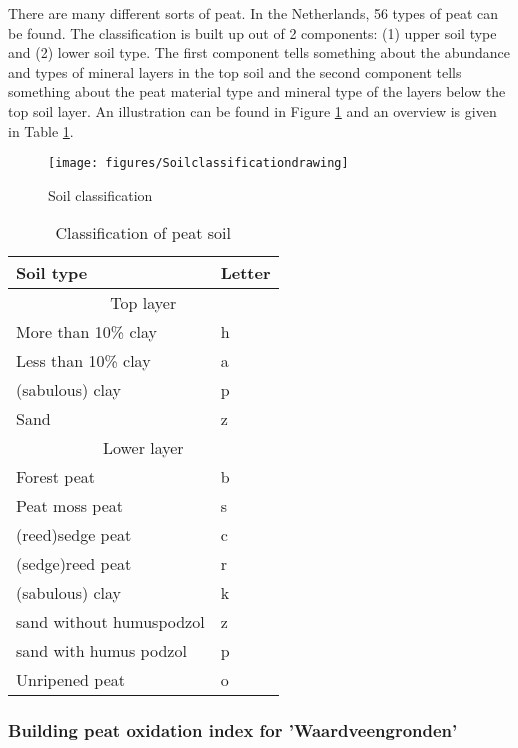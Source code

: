\documentclass[12pt,a4paper,titlepage]{article}
\begin{document}
There are many different sorts of peat. In the Netherlands, 56 types of peat can be found. The classification is built up out of 2 components: (1) upper soil type and (2) lower soil type. The first component tells something about the abundance and types of mineral layers in the top soil and the second component tells something about the peat material type and mineral type of the layers below the top soil layer. An illustration can be found in Figure \ref{fig:soilclass} and an overview is given in Table \ref{tab:soilclass}.

\begin{figure}
    \centering
    \texttt{[image: figures/Soilclassificationdrawing]} 
    \caption{Soil classification}
    \label{fig:soilclass}
\end{figure}

\begin{table}[htbp]
\caption{Classification of peat soil}
\begin{center}
\begin{tabular}{|l|l|}
\hline
\textbf{Soil type} & \textbf{Letter} \\ \hline
\multicolumn{ 2}{|c|}{Top layer} \\ \hline
More than 10\% clay & h \\ \hline
Less than 10\% clay & a \\ \hline
(sabulous) clay & p \\ \hline
Sand & z \\ \hline
\multicolumn{ 2}{|c|}{Lower layer} \\ \hline
Forest peat & b \\ \hline
Peat moss peat & s \\ \hline
(reed)sedge peat & c \\ \hline
(sedge)reed peat & r \\ \hline
(sabulous) clay & k \\ \hline
sand without humuspodzol & z \\ \hline
sand with humus podzol & p \\ \hline
Unripened peat & o \\ \hline
\end{tabular}
\end{center}
\label{tab:soilclass}
\end{table}



\subsubsection{Building peat oxidation index for 'Waardveengronden'}
\end{document}
